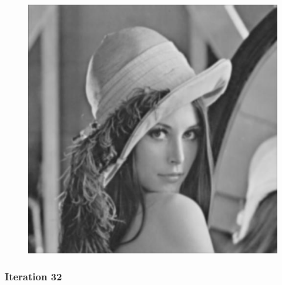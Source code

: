 \documentclass[11pt]{article}
\makeatletter
\def\maxwidth{\ifdim\Gin@nat@width>\linewidth\linewidth
    \else\Gin@nat@width\fi}
\let\Oldincludegraphics\includegraphics
\renewcommand{\includegraphics}[1]{\Oldincludegraphics[width=.8\maxwidth]{#1}}
\makeatother
\begin{document}
\begin{figure}[!htbp]
	\centering
	\includegraphics{"15th iterations_const"}
	\label{fig:15th-iterationsconst}
\end{figure}
\clearpage
    \hypertarget{iteration-32}{%
\subsubsection{Iteration 32}\label{iteration-32}}
\end{document}

